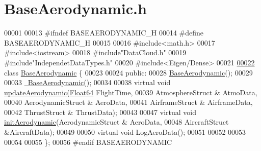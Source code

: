 \hypertarget{_base_aerodynamic_8h_source}{}\section{Base\+Aerodynamic.\+h}
\label{_base_aerodynamic_8h_source}

\begin{DoxyCode}
00001 
00013 \textcolor{preprocessor}{#ifndef BASEAERODYNAMIC\_H}
00014 \textcolor{preprocessor}{#define BASEAERODYNAMIC\_H}
00015 
00016 \textcolor{preprocessor}{#include<math.h>}
00017 \textcolor{preprocessor}{#include<iostream>}
00018 \textcolor{preprocessor}{#include"DataCloud.h"}
00019 \textcolor{preprocessor}{#include"IndependetDataTypes.h"}
00020 \textcolor{preprocessor}{#include<Eigen/Dense>}
00021 
\hyperlink{group___aerodynamic}{00022} \textcolor{keyword}{class }\hyperlink{group___aerodynamic_class_base_aerodynamic}{BaseAerodynamic} \{
00023 
00024 \textcolor{keyword}{public}:
00028     \hyperlink{group___aerodynamic_aa05d0598119b1364cdb45cf478ae578c}{BaseAerodynamic}();
00029 
00033     \hyperlink{group___aerodynamic_a81d08f3a779e6e25245b6f3b545920cb}{~BaseAerodynamic}();
00034 
00038     \textcolor{keyword}{virtual} \textcolor{keywordtype}{void} \hyperlink{group___aerodynamic_a6354f3c8433c7a2235041f843d4fe10e}{updateAerodynamic}(\hyperlink{group___tools_ga3f1431cb9f76da10f59246d1d743dc2c}{Float64} FlightTime,
00039                             AtmosphereStruct & AtmoData,
00040                             AerodynamicStruct & AeroData,
00041                             AirframeStruct & AirframeData,
00042                             ThrustStruct & ThrustData);
00043 
00047     \textcolor{keyword}{virtual} \textcolor{keywordtype}{void} \hyperlink{group___aerodynamic_a5ea58755a40507d217848efb151879c8}{initAerodynamic}(AerodynamicStruct & AeroData,
00048                          AircraftStruct &AircraftData);
00049 
00050     \textcolor{keyword}{virtual} \textcolor{keywordtype}{void} LogAeroData();
00051 
00052 
00053 
00054 
00055 \};
00056 \textcolor{preprocessor}{#endif BASEAERODYNAMIC}
\end{DoxyCode}
